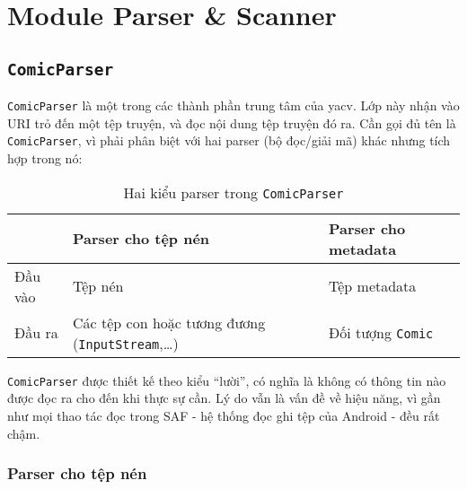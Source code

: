 \documentclass[../../../../thesis]{subfiles}
\begin{document}
\section{Module Parser \& Scanner}\label{parser-scanner-module}



\subsection{\texttt{ComicParser}}

\texttt{ComicParser} là một trong các thành phần trung tâm của yacv. Lớp này
nhận vào URI trỏ đến một tệp truyện, và đọc nội dung tệp truyện đó ra. Cần gọi
đủ tên là \texttt{ComicParser}, vì phải phân biệt với hai parser (bộ đọc/giải
mã) khác nhưng tích hợp trong nó:

\begin{table}[H]
    \centering
    \caption{Hai kiểu parser trong \texttt{ComicParser}}
    \label{tab:2-parsers}
    \begin{tabular}{l p{6cm} l}
        \toprule
                & Parser cho tệp nén & Parser cho metadata \\
        \midrule
        Đầu vào & Tệp nén            & Tệp metadata \\
        Đầu ra  & Các tệp con hoặc tương đương (\texttt{InputStream},\ldots) & Đối tượng \texttt{Comic} \\
        \bottomrule
    \end{tabular}
\end{table}

\texttt{ComicParser} được thiết kế theo kiểu ``lười'', có nghĩa là không có
thông tin nào được đọc ra cho đến khi thực sự cần. Lý do vẫn là vấn đề về hiệu
năng, vì gần như mọi thao tác đọc trong SAF - hệ thống đọc ghi tệp của Android -
đều rất chậm.



\subsubsection{Parser cho tệp nén}
\end{document}

